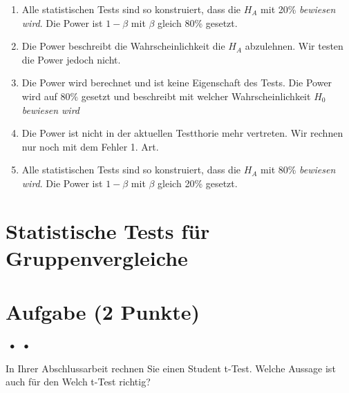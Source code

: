 \documentclass[a4paper, 9pt]{scrartcl}\usepackage[]{graphicx}\usepackage[]{xcolor}
\begin{document}
\begin{enumerate}
\item [\textbf{A} \msquare] Alle statistischen Tests sind so konstruiert, dass die $H_A$ mit 20\% \textit{bewiesen wird}. Die Power ist $1-\beta$ mit $\beta$ gleich 80\% gesetzt.
\item [\textbf{B} \msquare] Die Power beschreibt die Wahrscheinlichkeit die $H_A$ abzulehnen. Wir testen die Power jedoch nicht.
\item [\textbf{C} \msquare] Die Power wird berechnet und ist keine Eigenschaft des Tests. Die Power wird auf $80\%$ gesetzt und beschreibt mit welcher Wahrscheinlichkeit $H_0$ \textit{bewiesen wird}
\item [\textbf{D} \msquare] Die Power ist nicht in der aktuellen Testthorie mehr vertreten. Wir rechnen nur noch mit dem Fehler 1. Art.
\item [\textbf{E} \msquare] Alle statistischen Tests sind so konstruiert, dass die $H_A$ mit 80\% \textit{bewiesen wird}. Die Power ist $1-\beta$ mit $\beta$ gleich 20\% gesetzt.
\end{enumerate}
\section*{Statistische Tests für Gruppenvergleiche} 

\section{Aufgabe \hfill (2 Punkte)}

\ifcollection
\begin{flushright}
\tiny\vspace{-2Ex}
\textbf{\examinhaltstart}
\exammodulemathstat $\;\bullet$
\exammodulestat $\;\bullet$
\exammodulestatbbv 
\vspace{-1Ex}
\end{flushright}
\fi




In Ihrer Abschlussarbeit rechnen Sie einen Student t-Test. Welche Aussage ist auch für den Welch t-Test richtig?
\end{document}
